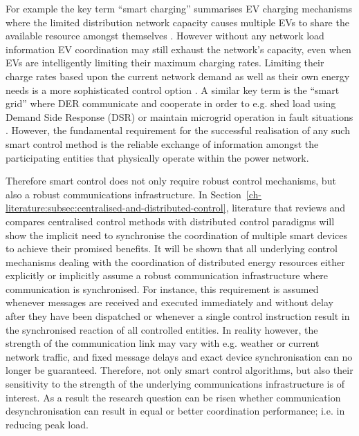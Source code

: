 For example the key term ``smart charging'' summarises EV charging mechanisms where the limited distribution network capacity causes multiple EVs to share the available resource amongst themselves \cite{Sortomme2011, Vaya2012, Garcia-Villalobos2014}.
However without any network load information EV coordination may still exhaust the network's capacity, even when EVs are intelligently limiting their maximum charging rates.
Limiting their charge rates based upon the current network demand as well as their own energy needs is a more sophisticated control option \cite{Karfopoulos2013}.
A similar key term is the ``smart grid'' where DER communicate and cooperate in order to e.g. shed load using Demand Side Response (DSR) or maintain microgrid operation in fault situations \cite{Samadi2012, Liu2014, Liang2014}.
However, the fundamental requirement for the successful realisation of any such smart control method is the reliable exchange of information amongst the participating entities that physically operate within the power network.

Therefore smart control does not only require robust control mechanisms, but also a robust communications infrastructure.
In Section~\ref{ch-literature:subsec:centralised-and-distributed-control}, literature that reviews and compares centralised control methods with distributed control paradigms will show the implicit need to synchronise the coordination of multiple smart devices to achieve their promised benefits.
It will be shown that all underlying control mechanisms dealing with the coordination of distributed energy resources either explicitly or implicitly assume a robust communication infrastructure where communication is synchronised.
For instance, this requirement is assumed whenever messages are received and executed immediately and without delay after they have been dispatched or whenever a single control instruction result in the synchronised reaction of all controlled entities.
In reality however, the strength of the communication link may vary with e.g. weather or current network traffic, and fixed message delays and exact device synchronisation can no longer be guaranteed.
Therefore, not only smart control algorithms, but also their sensitivity to the strength of the underlying communications infrastructure is of interest.
As a result the research question can be risen whether communication desynchronisation can result in equal or better coordination performance; i.e. in reducing peak load.

